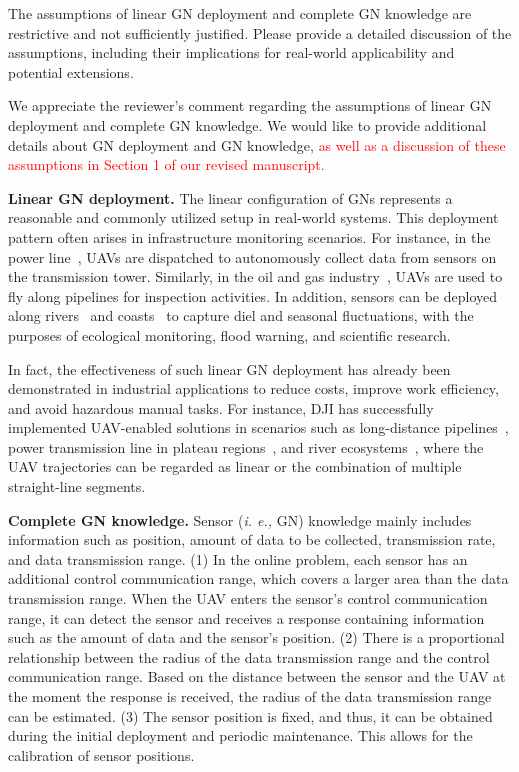 \begin{revcomment}
	The assumptions of linear GN deployment and complete GN knowledge are restrictive and not sufficiently justified. Please provide a detailed discussion of the assumptions, including their implications for real-world applicability and potential extensions.
\end{revcomment}
\begin{revresponse}
	We appreciate the reviewer's comment regarding the assumptions of linear GN deployment and complete GN knowledge.
	We would like to provide additional details about GN deployment and GN knowledge, 
	\textcolor{red}{as well as a discussion of these assumptions in Section 1 of our revised manuscript.}

	\textbf{Linear GN deployment.}
	The linear configuration of GNs represents a reasonable and commonly utilized setup in real-world systems.
	This deployment pattern often arises in infrastructure monitoring scenarios.
	For instance, in the power line~\cite{powerline,transmission-line}, UAVs are dispatched to autonomously collect data from sensors on the transmission tower.
	Similarly, in the oil and gas industry~\cite{pipeline}, UAVs are used to fly along pipelines for inspection activities.
	In addition, sensors can be deployed along rivers~\cite{river} and coasts~\cite{coast} to capture diel and seasonal fluctuations, with the purposes of ecological monitoring, flood warning, and scientific research.

	In fact, the effectiveness of such linear GN deployment has already been demonstrated in industrial applications to reduce costs, improve work efficiency, and avoid hazardous manual tasks.
	For instance, DJI has successfully implemented UAV-enabled solutions in scenarios such as long-distance pipelines~\cite{DJI-pipeline}, power transmission line in plateau regions~\cite{DJI-powerline}, and river ecosystems~\cite{DJI-river}, where the UAV trajectories can be regarded as linear or the combination of multiple straight-line segments.

	\textbf{Complete GN knowledge.}
	Sensor (\emph{i. e.,} GN) knowledge mainly includes information such as position, amount of data to be collected, transmission rate, and data transmission range.
	(1) In the online problem, each sensor has an additional control communication range, which covers a larger area than the data transmission range.
	When the UAV enters the sensor's control communication range, it can detect the sensor and receives a response containing information such as the amount of data and the sensor's position.
	(2) There is a proportional relationship between the radius of the data transmission range and the control communication range.
	Based on the distance between the sensor and the UAV at the moment the response is received, the radius of the data transmission range can be estimated.
	(3) The sensor position is fixed, and thus, it can be obtained during the initial deployment and periodic maintenance. This allows for the calibration of sensor positions.


\end{revresponse}
